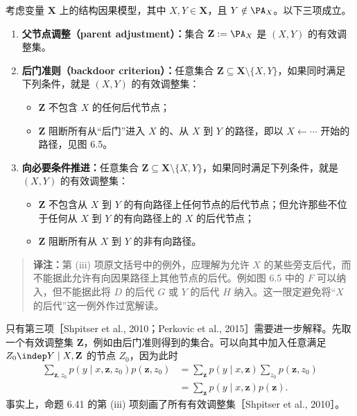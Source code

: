 

\begin{proposition}[有效调整集]
考虑变量 $\mathbf X$ 上的结构因果模型，其中 $X,Y\in\mathbf X$，且 $Y\notin\PA_X$。以下三项成立。
\begin{enumerate}[label=(\roman*)]
 \item \textbf{父节点调整（parent adjustment）：}集合 $\mathbf Z:=\PA_X$ 是 $(X,Y)$ 的有效调整集。
 \item \textbf{后门准则（backdoor criterion）：}任意集合 $\mathbf Z\subseteq\mathbf X\setminus\{X,Y\}$，如果同时满足下列条件，就是 $(X,Y)$ 的有效调整集：
 \begin{itemize}
 \item $\mathbf Z$ 不包含 $X$ 的任何后代节点；
 \item $\mathbf Z$ 阻断所有从“后门”进入 $X$ 的、从 $X$ 到 $Y$ 的路径，即以 $X\leftarrow\cdots$ 开始的路径，见图 6.5。
 \end{itemize}
 \item \textbf{向必要条件推进：}任意集合 $\mathbf Z\subseteq\mathbf X\setminus\{X,Y\}$，如果同时满足下列条件，就是 $(X,Y)$ 的有效调整集：
 \begin{itemize}
 \item $\mathbf Z$ 不包含从 $X$ 到 $Y$ 的有向路径上任何节点的后代节点；但允许那些不位于任何从 $X$ 到 $Y$ 的有向路径上的 $X$ 的后代节点；
 \item $\mathbf Z$ 阻断所有从 $X$ 到 $Y$ 的非有向路径。
 \end{itemize}
\end{enumerate}
\end{proposition}
\begin{quote}\small
\textbf{译注：}第 (iii) 项原文括号中的例外，应理解为允许 $X$ 的某些旁支后代，而不能据此允许有向因果路径上其他节点的后代。例如图 6.5 中的 $F$ 可以纳入，但不能据此将 $D$ 的后代 $G$ 或 $Y$ 的后代 $H$ 纳入。这一限定避免将“$X$ 的后代”这一例外作过宽解读。
\end{quote}

只有第三项［Shpitser et al., 2010；Perkovic et al., 2015］需要进一步解释。先取一个有效调整集 $\mathbf Z$，例如由后门准则得到的集合。可以向其中加入任意满足 $Z_0\indep Y\mid X,\mathbf Z$ 的节点 $Z_0$，因为此时
\[
 \begin{aligned}
 \sum_{\mathbf z,z_0}p(y\mid x,\mathbf z,z_0)p(\mathbf z,z_0)
 &=\sum_{\mathbf z}p(y\mid x,\mathbf z)\sum_{z_0}p(\mathbf z,z_0)\\
 &=\sum_{\mathbf z}p(y\mid x,\mathbf z)p(\mathbf z).
 \end{aligned}
\]
事实上，命题 6.41 的第 (iii) 项刻画了所有有效调整集［Shpitser et al., 2010］。

